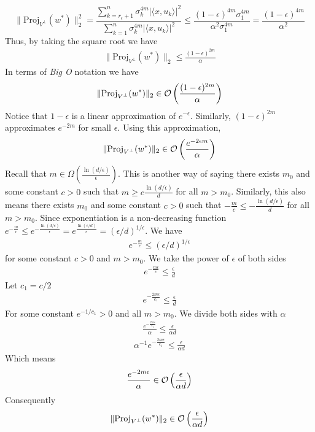 \documentclass[a4paper, english, headtopline=0.08em, headsepline=0.04em, left = 1cm, right = 1cm, DIV=15]{article}
\begin{document}
$$
\|\text{Proj}_{V^{\bot }}(w^*)\|_2^2=
\frac{\sum_{k=r_\epsilon + 1}^n \sigma_k^{4m} |\langle x, u_k \rangle|^2}{\sum_{k=1}^n \sigma_k^{4m} |\langle x, u_k \rangle|^2}
\leq \frac{(1-\epsilon)^{4m} \sigma_1^{4m}}{\alpha^2 \sigma_1^{4m}}
= \frac{(1-\epsilon)^{4m}}{\alpha^2}
$$
Thus, by taking the square root we have
\begin{align*}
	\|\text{Proj}_{V^{\bot }}(w^*)\|_2 \leq \frac{(1-\epsilon)^{2m}}{\alpha}
\end{align*}
In terms of \textit{Big O} notation we have
\begin{align*}
	\|\text{Proj}_{V^{\bot }}(w^*)\|_2 \in \mathcal{O}\left(\frac{(1-\epsilon)^{2m}}{\alpha}\right) 
\end{align*}
Notice that $1-\epsilon$ is a linear approximation of $e^{-\epsilon}$. Similarly, $(1-\epsilon)^{2m}$ approximates
$e^{-2m}$ for small $\epsilon$. Using this approximation,
\begin{align*}
	\|\text{Proj}_{V^{\bot }}(w^*)\|_2 \in \mathcal{O}\left(\frac{e^{-2\epsilon m}}{\alpha}\right) 
\end{align*}
Recall that $m\in \Omega\left(\frac{\ln(d/\epsilon)}{\epsilon}\right)$. This is another way
of saying there exists $m_0$ and some constant $c>0$ such that $m \geq c\frac{\ln(d/\epsilon)}{d}$ for all $m>m_0$.
Similarly, this also means there exists $m_0$ and some 
constant $c>0$ such that $-\frac{m}{c} \leq -\frac{\ln(d/\epsilon)}{d}$ for all $m>m_0$.
Since exponentiation is a non-decreasing function $e^{-\frac{m}{c}} \leq e^{-\frac{\ln(d/\epsilon)}{\epsilon}} = e^{\frac{\ln(\epsilon/d)}{\epsilon}} = (\epsilon/d)^{1/\epsilon}$. We have
\begin{align*}
	e^{-\frac{m}{c}} \leq (\epsilon/d)^{1/\epsilon}
\end{align*}
for some constant $c>0$ and $m>m_0$. 
We take the power of $\epsilon$ of both sides
\begin{align*}
	e^{-\frac{m\epsilon}{c}} \leq \frac{\epsilon}{d}
\end{align*}
Let $c_1 = c/2$
\begin{align*}
	e^{-\frac{2m\epsilon}{c_1}} \leq \frac{\epsilon}{d}
\end{align*}
For some constant $e^{-1/c_1}>0$ and all $m > m_0$. We divide both sides with $\alpha$
\begin{align*}
	\frac{e^{-\frac{2m\epsilon}{c_1}}}{\alpha} \leq \frac{\epsilon}{\alpha d}
\end{align*}
\begin{align*}
	{\alpha}^{-1}{e^{-\frac{2m\epsilon}{c_1}}} \leq \frac{\epsilon}{\alpha d}
\end{align*}
Which means
\begin{align*}
	\frac{e^{-{2m\epsilon}}}{\alpha} \in \mathcal{O}\left(\frac{\epsilon}{\alpha d}\right) 
\end{align*}
Consequently
\begin{align*}
	\|\text{Proj}_{V^{\bot }}(w^*)\|_2 \in \mathcal{O}\left(\frac{\epsilon}{\alpha d}\right) 
\end{align*}
\end{document}
